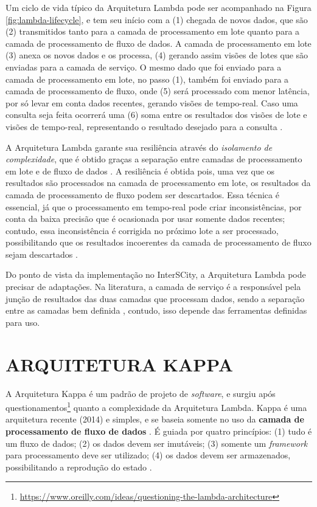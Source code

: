 Um ciclo de vida típico da Arquitetura Lambda pode ser acompanhado na Figura
\ref{fig:lambda-lifecycle}, e tem seu início com a (1) chegada
de novos dados, que são (2) transmitidos tanto para a camada
de processamento em lote quanto para a camada de processamento de fluxo de dados.
A camada de processamento em lote (3) anexa os novos dados e os processa, (4) gerando assim
visões de lotes que são enviadas para a camada de serviço. O mesmo
dado que foi enviado para a camada de processamento em lote, no passo (1), também foi
enviado para a camada de processamento de fluxo, onde (5) será processado com menor latência,
por só levar em conta dados recentes, gerando visões de tempo-real. 
Caso uma consulta seja feita ocorrerá uma (6) soma entre os resultados
dos visões de lote e visões de tempo-real, representando o resultado
desejado para a consulta \cite{marz2015}.

A Arquitetura Lambda garante sua resiliência através do \textit{isolamento de
complexidade}, que é obtido graças a separação entre camadas de processamento em
lote e de fluxo de dados \cite{marz2015}. A resiliência é obtida pois, uma vez que os
resultados são processados na camada de processamento em lote, os resultados da camada
de processamento de fluxo podem ser descartados. Essa técnica é essencial, já que o
processamento em tempo-real pode criar inconsistências, por conta da baixa
precisão que é ocasionada por usar somente dados recentes; contudo, essa
inconsistência é corrigida no próximo lote a ser processado,
possibilitando que os resultados incoerentes da camada de processamento de fluxo
sejam descartados \cite{marz2015}.

Do ponto de vista da implementação no InterSCity, a Arquitetura Lambda pode
precisar de adaptações. Na literatura, a camada de serviço é a
responsável pela junção de resultados das duas camadas que processam dados,
sendo a separação entre as camadas bem definida \cite{marz2015}, contudo, isso
depende das ferramentas definidas para uso. 

\section{ARQUITETURA KAPPA}

A Arquitetura Kappa é um padrão de projeto de \textit{software}, e surgiu após
questionamentos\footnote{\url{https://www.oreilly.com/ideas/questioning-the-lambda-architecture}}
quanto a complexidade da Arquitetura Lambda. Kappa é uma arquitetura recente (2014) e
simples, e se baseia somente no uso da \textbf{camada de processamento de fluxo
de dados} \cite{seyvet2016}. É guiada por quatro princípios: (1) tudo é um
fluxo de dados; (2) os dados devem ser imutáveis; (3) somente um
\textit{framework} para processamento deve ser utilizado; (4) os dados devem ser
armazenados, possibilitando a reprodução do estado \cite{seyvet2016}.

